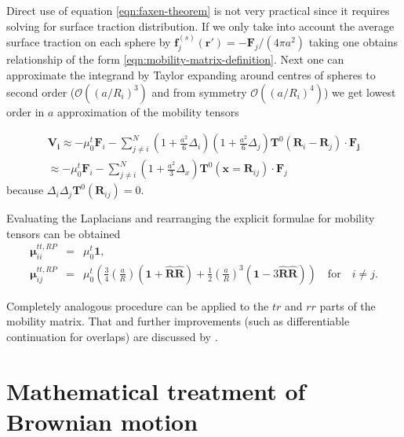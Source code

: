 \documentclass{doctoral}
\begin{document}
Direct use of equation \eqref{eqn:faxen-theorem} is not very practical since it requires solving for surface traction distribution.
If we only take into account the average surface traction on each sphere  by $\bm{f}_j^{(s)}(\bm{r'}) = -\bm{F}_j / (4\pi a^2)$ taking one obtains relationship of the form \eqref{eqn:mobility-matrix-definition}.
Next one can approximate the integrand by Taylor expanding around centres of spheres to second order ($\mathcal{O}((a/R_i)^3)$ and from symmetry $\mathcal{O}((a/R_i)^4)$) we get lowest order in $a$ approximation of the mobility tensors 

\begin{eqnarray}
    \bm{V_i} \approx -\mu_0^t \bm{F}_i  - \sum_{j\neq i}^N (1 + \frac{a^2}{6} \Delta_i) (1 + \frac{a^2}{6} \Delta_j) \bm{T}^{0} (\bm{R}_i - \bm{R}_j) \cdot \bm{F_j} \\
    \approx -\mu_0^t \bm{F}_i  - \sum_{j\neq i}^N (1 + \frac{a^2}{3} \Delta_x) \bm{T}^{0} (\bm{x} = \bm{R}_{ij}) \cdot \bm{F}_j \label{eqn:rotne-prager-derivation}
\end{eqnarray}
because $\Delta_i \Delta_j \bm{T}^0(\bm{R}_{ij}) = 0$.

Evaluating the Laplacians and rearranging the explicit formulae for mobility tensors can be obtained
\begin{eqnarray}
    \bm{\mu}_{ii}^{tt,RP} & = & \mu_0^t \bm{1},                                                                                                                                                                                                                                 \\
    \bm{\mu}_{ij}^{tt,RP} & = & \mu_0^t \left( \frac{3}{4} \left( \frac{a}{R} \right) \left( \bm{1} + \bm{\hat{R}}\bm{\hat{R}} \right) + \frac{1}{2} \left( \frac{a}{R} \right)^3 \left( \bm{1} -3  \bm{\hat{R}}\bm{\hat{R}} \right) \right) \quad \mathrm{for} \quad i \neq j.
    \label{eqn:rotne-prager-translation}
\end{eqnarray}


Completely analogous procedure can be applied to the $tr$ and $rr$ parts of the mobility matrix.
That and further improvements (such as differentiable continuation for overlaps) are discussed by \textcite{Zuk_2018}.

\section{Mathematical treatment of Brownian motion}
\label{sec:SDE}
\end{document}
